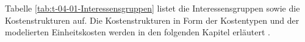 Tabelle \ref{tab:t-04-01-Interessensgruppen} listet die Interessensgruppen sowie die Kostenstrukturen auf. Die Kostenstrukturen in Form der Kostentypen und der modelierten Einheitskosten werden in den folgenden Kapitel erläutert .



\newpage

%

